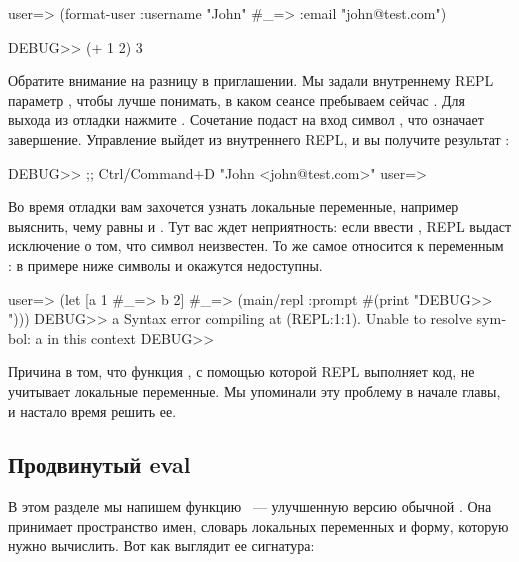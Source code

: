 \begin{english}
  \begin{text}
user=> (format-user {:username "John"
  #_=>               :email "john@test.com"})

DEBUG>> (+ 1 2)
3
  \end{text}
\end{english}

Обратите внимание на разницу в приглашении. Мы задали внутреннему REPL параметр , чтобы лучше понимать, в каком сеансе пребываем сейчас . Для выхода из отладки нажмите . Сочетание подаст на вход символ , что означает завершение. Управление выйдет из внутреннего REPL, и вы получите результат :

\begin{english}
  \begin{text}
DEBUG>> ;; Ctrl/Command+D
"John <john@test.com>"
user=>
  \end{text}
\end{english}

Во время отладки вам захочется узнать локальные переменные, например выяснить, чему равны  и . Тут вас ждет неприятность: если ввести , REPL выдаст исключение о том, что символ неизвестен. То же самое относится к переменным : в примере ниже символы  и  окажутся недоступны.

\begin{english}
  \begin{text}
user=> (let [a 1
  #_=>       b 2]
  #_=>   (main/repl :prompt #(print "DEBUG>> ")))
DEBUG>> a
Syntax error compiling at (REPL:1:1).
Unable to resolve symbol: a in this context
DEBUG>>
  \end{text}
\end{english}

Причина в том, что функция , с помощью которой REPL выполняет код, не учитывает локальные переменные. Мы упоминали эту проблему в начале главы, и настало время решить ее.

\subsection{Продвинутый eval}

В этом разделе мы напишем функцию ~--- улучшенную версию обычной . Она принимает пространство имен, словарь локальных переменных и форму, которую нужно вычислить. Вот как выглядит ее сигнатура:

